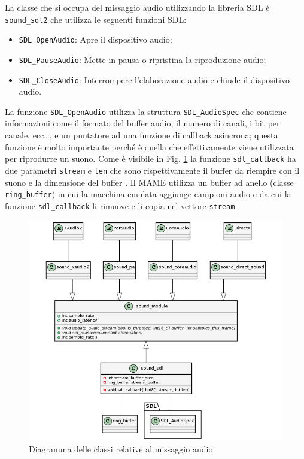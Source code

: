 La classe che si occupa del missaggio audio utilizzando la libreria SDL è \verb|sound_sdl2| che utilizza le seguenti funzioni SDL:

\begin{itemize}	
	\item \verb|SDL_OpenAudio|: Apre il dispositivo audio;
	\item \verb|SDL_PauseAudio|: Mette in pausa o ripristina la riproduzione audio;
	\item \verb|SDL_CloseAudio|: Interrompere l'elaborazione audio e chiude il dispositivo audio.
\end{itemize}

La funzione \verb|SDL_OpenAudio| utilizza la struttura \verb|SDL_AudioSpec| che contiene informazioni come il formato del buffer audio, il numero di canali, i bit per canale, ecc\dots, e un puntatore ad una funzione di callback asincrona; questa funzione è molto importante perché è quella che effettivamente viene utilizzata per riprodurre un suono. Come è visibile in Fig. \ref{fig:class_mixingSDLFull} la funzione \verb|sdl_callback| ha due parametri \verb|stream| e \verb|len| che sono rispettivamente il buffer da riempire con il suono e la dimensione del buffer \parencite{FocusOnSDL}. Il MAME utilizza un buffer ad anello (classe \verb|ring_buffer|) in cui la macchina emulata aggiunge campioni audio e da cui la funzione \verb|sdl_callback| li rimuove e li copia nel vettore \verb|stream|.

\begin{figure}[H]
	\includegraphics[width=\linewidth]{immagini/class_mixingSDLFull}
	\caption{Diagramma delle classi relative al missaggio audio}
	\label{fig:class_mixingSDLFull}
\end{figure}

